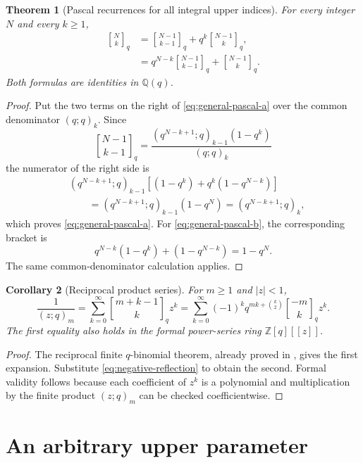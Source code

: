 \documentclass[11pt,oneside,openany]{book}
\newtheorem{theorem}{Theorem}[chapter]
\newtheorem{corollary}[theorem]{Corollary}
\theoremstyle{definition}
\theoremstyle{remark}
\newcommand{\Qbinom}[3]{\genfrac{[}{]}{0pt}{}{#1}{#2}_{#3}}
\newcommand{\Q}{\mathbb Q}
\newcommand{\Z}{\mathbb Z}
\newcommand{\abs}[1]{\lvert #1\rvert}
\begin{document}
\begin{theorem}[Pascal recurrences for all integral upper indices]\label{thm:generalized-pascal}
For every integer $N$ and every $k\ge1$,
\begin{align}
 \Qbinom Nkq
 &=\Qbinom{N-1}{k-1}q+q^k\Qbinom{N-1}{k}q,
 \tag{17.3}\label{eq:general-pascal-a}\\
 &=q^{N-k}\Qbinom{N-1}{k-1}q+\Qbinom{N-1}{k}q.
 \tag{17.4}\label{eq:general-pascal-b}
\end{align}
Both formulas are identities in $\Q(q)$.
\end{theorem}

\begin{proof}
Put the two terms on the right of \eqref{eq:general-pascal-a} over the common denominator $(q;q)_k$.  Since
\[
 \Qbinom{N-1}{k-1}q
 =\frac{(q^{N-k+1};q)_{k-1}(1-q^k)}{(q;q)_k}
\]
the numerator of the right side is
\begin{align*}
 &(q^{N-k+1};q)_{k-1}
 \left[(1-q^k)+q^k(1-q^{N-k})\right]\\
 &\qquad=(q^{N-k+1};q)_{k-1}(1-q^N)
 =(q^{N-k+1};q)_k,
\end{align*}
which proves \eqref{eq:general-pascal-a}.  For \eqref{eq:general-pascal-b}, the corresponding bracket is
\[
 q^{N-k}(1-q^k)+(1-q^{N-k})=1-q^N.
\]
The same common-denominator calculation applies.
\end{proof}

\begin{corollary}[Reciprocal product series]\label{cor:reciprocal-product-negative}
For $m\ge1$ and $\abs z<1$,
\[
 \frac1{(z;q)_m}
 =\sum_{k=0}^{\infty}\Qbinom{m+k-1}{k}q z^k
 =\sum_{k=0}^{\infty}(-1)^kq^{mk+\binom k2}
   \Qbinom{-m}{k}qz^k.
 \tag{17.5}\label{eq:negative-reciprocal-series}
\]
The first equality also holds in the formal power-series ring $\Z[q][[z]]$.
\end{corollary}

\begin{proof}
The reciprocal finite $q$-binomial theorem, already proved in , gives the first expansion.  Substitute \eqref{eq:negative-reflection} to obtain the second.  Formal validity follows because each coefficient of $z^k$ is a polynomial and multiplication by the finite product $(z;q)_m$ can be checked coefficientwise.
\end{proof}

\section{An arbitrary upper parameter}
\end{document}
